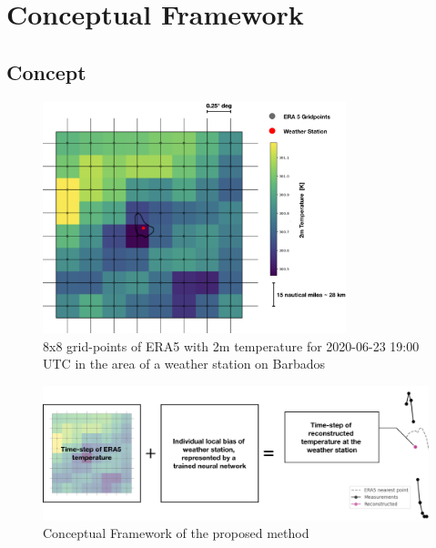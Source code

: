 \section{Conceptual Framework}
\label{sec:design}

\subsection{Concept}

\begin{figure}
    \centering
    \includegraphics[width=250pt]{resources/images/ERA5_tas_around_barbados.png}
    \caption{8x8 grid-points of ERA5 with 2m temperature 
    for 2020-06-23 19:00 UTC  in the area of a weather station on Barbados}    
    \label{fig:barbados}
\end{figure}

\begin{figure}
    \centering
    \includegraphics[width=450pt]{resources/images/digitaltwin_schema.png}
    \caption{Conceptual Framework of the proposed method}    
    \label{fig:concept}
\end{figure}

